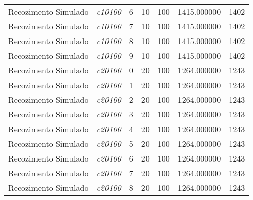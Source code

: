 {\begin{longtable}{cc|c|cc|cc}
			Recozimento Simulado & \textit{c10100}    & 6                               & 10               & 100              & 1415.000000                          & 1402 \\ 
			Recozimento Simulado & \textit{c10100}    & 7                               & 10               & 100              & 1415.000000                          & 1402 \\ 
			Recozimento Simulado & \textit{c10100}    & 8                               & 10               & 100              & 1415.000000                          & 1402 \\ 
			Recozimento Simulado & \textit{c10100}    & 9                               & 10               & 100              & 1415.000000                          & 1402 \\ \hline
			Recozimento Simulado & \textit{c20100}    & 0                               & 20               & 100              & 1264.000000                          & 1243 \\ 
			Recozimento Simulado & \textit{c20100}    & 1                               & 20               & 100              & 1264.000000                          & 1243 \\ 
			Recozimento Simulado & \textit{c20100}    & 2                               & 20               & 100              & 1264.000000                          & 1243 \\ 
			Recozimento Simulado & \textit{c20100}    & 3                               & 20               & 100              & 1264.000000                          & 1243 \\ 
			Recozimento Simulado & \textit{c20100}    & 4                               & 20               & 100              & 1264.000000                          & 1243 \\ 
			Recozimento Simulado & \textit{c20100}    & 5                               & 20               & 100              & 1264.000000                          & 1243 \\ 
			Recozimento Simulado & \textit{c20100}    & 6                               & 20               & 100              & 1264.000000                          & 1243 \\ 
			Recozimento Simulado & \textit{c20100}    & 7                               & 20               & 100              & 1264.000000                          & 1243 \\ 
			Recozimento Simulado & \textit{c20100}    & 8                               & 20               & 100              & 1264.000000                          & 1243 \\ 

\end{longtable}}
